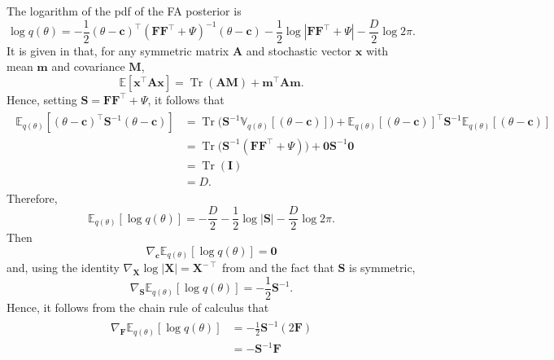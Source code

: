 \documentclass[msc,deptreport.inf]{infthesis} %
\newcommand{\matr}[1]{\mathbf{#1}}
\newcommand{\E}{\mathbb E}
\newcommand{\V}{\mathbb V}
\newcommand{\tr}{\mathop{\mathrm{Tr}}}
\begin{document}
The logarithm of the pdf of the FA posterior is
\begin{equation}
	\log q(\theta)
	= -\frac{1}{2} (\theta - \matr{c})^\intercal (\matr{FF}^{\intercal} + \Psi)^{-1} (\theta - \matr{c})  
	- \frac{1}{2} \log |\matr{FF}^{\intercal} + \Psi| 
	- \frac{D}{2} \log 2\pi.
\end{equation}
It is given in \cite{petersen2012} that, for any symmetric matrix $\matr{A}$ and stochastic vector $\matr{x}$ with mean $\matr{m}$ and covariance $\matr{M}$,
\begin{equation}\label{eqn:expectation_xTAx}
	\E [\matr{x}^\intercal \matr{A} \matr{x}] = \tr(\matr{A}\matr{M}) + \matr{m}^\intercal \matr{A} \matr{m}.
\end{equation}
Hence, setting $\matr{S} = \matr{FF}^{\intercal} + \Psi$, it follows that
\begin{align}
\begin{split}
	\E_{q(\theta)} [(\theta - \matr{c})^\intercal \matr{S}^{-1} (\theta - \matr{c}) ] 
	& = \tr\big(\matr{S}^{-1} \V_{q(\theta)}[(\theta - \matr{c})] \big) 
	+ \E_{q(\theta)}[(\theta - \matr{c})]^\intercal \matr{S}^{-1} \E_{q(\theta)}[(\theta - \matr{c})] \\
	& = \tr\big(\matr{S}^{-1} (\matr{FF}^{\intercal} + \Psi)\big)
	+ \matr{0} \matr{S}^{-1} \matr{0} \\
	& = \tr(\matr{I}) \\
	& = D.
\end{split}
\end{align}
Therefore,
\begin{equation}\label{eqn:expectation_of_vi_dist}
	\E_{q(\theta)}[\log q(\theta)]
	= -\frac{D}{2} - \frac{1}{2} \log |\matr{S}| - \frac{D}{2} \log 2\pi.
\end{equation}
Then 
\begin{equation}
	\nabla_\matr{c} \E_{q(\theta)} [\log q(\theta)] = \matr{0}
\end{equation}
and, using the identity $\nabla_\matr{X} \log |\matr{X}| = \matr{X}^{-\intercal}$ from \cite{petersen2012} and the fact that $\matr{S}$ is symmetric,
\begin{equation}
	\nabla_\matr{S} \E_{q(\theta)} [\log q(\theta)] = -\frac{1}{2} \matr{S}^{-1}.
\end{equation}
Hence, it follows from the chain rule of calculus that
\begin{align}
\begin{split}\label{eqn:grad_vi_dist_wrt_F}
	\nabla_\matr{F} \E_{q(\theta)} [\log q(\theta)]
	& = -\frac{1}{2} \matr{S}^{-1} (2\matr{F}) \\
	& = -\matr{S}^{-1}\matr{F}
\end{split}
\end{align}
\end{document}
